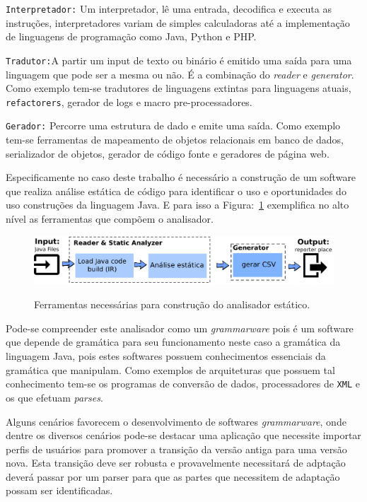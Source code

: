 \texttt{Interpretador:} Um interpretador, lê uma entrada, decodifica e executa as instruções, interpretadores variam de simples calculadoras até a implementação de linguagens de programação como Java, Python e PHP.

\texttt{Tradutor:}A partir um input de texto ou binário é emitido uma saída para uma linguagem que pode ser a mesma ou não. É a combinação do \textit{reader} e \textit{generator}. Como exemplo tem-se tradutores de linguagens extintas para linguagens atuais, \texttt{refactorers},  gerador de logs e macro pre-processadores.
	
\texttt{Gerador:} Percorre uma estrutura de dado e emite uma saída. Como exemplo tem-se ferramentas de mapeamento de objetos relacionais em banco de dados, serializador de objetos, gerador de código fonte e geradores de página web.



Especificamente no caso deste trabalho é necessário a construção de um software que realiza análise estática de código para identificar o uso e oportunidades do uso construções da linguagem Java. E para isso a Figura:~\ref{fig:stagesAnalyzer} exemplifica no alto nível as ferramentas que compõem o analisador.

\begin{figure}[h]
	\center
	\includegraphics[scale=0.9]{Imagens/stagesAnalizer}
	\label{fig:stagesAnalyzer}
	\caption{Ferramentas necessárias para construção do analisador estático.}
\end{figure}


Pode-se compreender este analisador como um {\it grammarware} pois é um software que depende de gramática para seu funcionamento neste caso a gramática da linguagem Java, pois estes softwares possuem conhecimentos essenciais da  gramática que manipulam. Como exemplos de arquiteturas que possuem tal conhecimento tem-se os programas de conversão de dados, processadores de \texttt{XML} e os que efetuam \textit{parses}.

Alguns cenários favorecem o desenvolvimento de softwares {\it grammarware}, onde dentre os diversos cenários pode-se destacar uma aplicação que necessite importar perfis de usuários para promover a transição da versão antiga para uma versão nova. Esta transição deve ser robusta e provavelmente necessitará de adptação deverá passar por um parser para que as partes que necessitem de adaptação possam ser identificadas.

